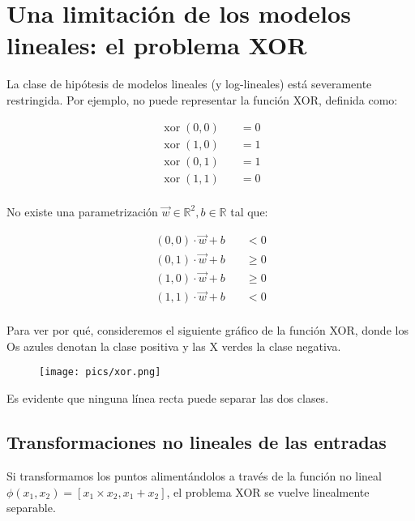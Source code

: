 

\section{Una limitación de los modelos lineales: el problema XOR}
La clase de hipótesis de modelos lineales (y log-lineales) está severamente restringida. Por ejemplo, no puede representar la función XOR, definida como:

\begin{equation}
\begin{split}
\operatorname{xor}(0,0) \quad & = 0 \\
\operatorname{xor}(1,0) \quad & = 1 \\
\operatorname{xor}(0,1) \quad & = 1 \\
\operatorname{xor}(1,1) \quad & = 0 \\
\end{split}
\end{equation}

No existe una parametrización $\vec{w} \in \mathbb{R}^2, b \in \mathbb{R}$ tal que:

\begin{equation}
\begin{split}
(0,0) \cdot \vec{w} + b \quad & < 0 \\
(0,1) \cdot \vec{w} + b \quad & \geq 0 \\
(1,0) \cdot \vec{w} + b \quad & \geq 0 \\
(1,1) \cdot \vec{w} + b \quad & < 0 \\
\end{split}
\end{equation}

Para ver por qué, consideremos el siguiente gráfico de la función XOR, donde los Os azules denotan la clase positiva y las X verdes la clase negativa.

\begin{figure}[htb]
	\centering
	 \texttt{[image: pics/xor.png]}
\end{figure}

Es evidente que ninguna línea recta puede separar las dos clases.


\subsection{Transformaciones no lineales de las entradas}
Si transformamos los puntos alimentándolos a través de la función no lineal $\phi(x_1,x_2) = [x_1 \times x_2, x_1 + x_2]$, el problema XOR se vuelve linealmente separable.

